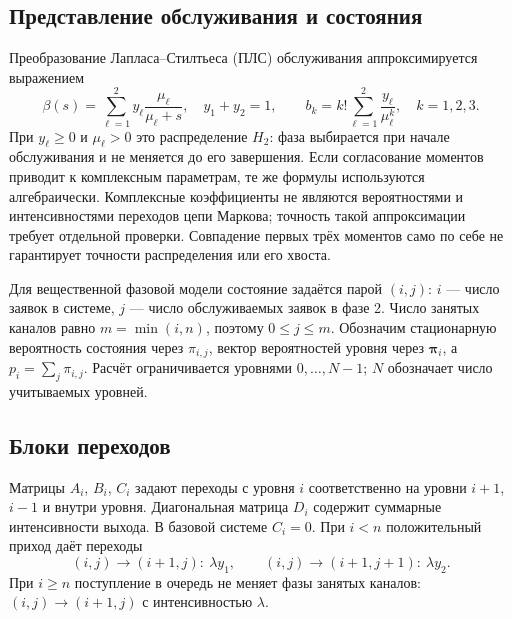 \documentclass[a4paper,12pt]{article}
\begin{document}
\subsection{Представление обслуживания и состояния}
Преобразование Лапласа--Стилтьеса (ПЛС) обслуживания аппроксимируется выражением
\[
\beta(s)=\sum_{\ell=1}^{2}y_\ell\frac{\mu_\ell}{\mu_\ell+s},\quad
y_1+y_2=1,\qquad
b_k=k!\sum_{\ell=1}^{2}\frac{y_\ell}{\mu_\ell^k},\quad k=1,2,3.
\]
При \(y_\ell\ge0\) и \(\mu_\ell>0\) это распределение \(H_2\): фаза выбирается при начале обслуживания и не меняется до его завершения. Если согласование моментов приводит к комплексным параметрам, те же формулы используются алгебраически. Комплексные коэффициенты не являются вероятностями и интенсивностями переходов цепи Маркова; точность такой аппроксимации требует отдельной проверки. Совпадение первых трёх моментов само по себе не гарантирует точности распределения или его хвоста.

Для вещественной фазовой модели состояние задаётся парой \((i,j)\): \(i\) --- число заявок в системе, \(j\) --- число обслуживаемых заявок в фазе 2. Число занятых каналов равно \(m=\min(i,n)\), поэтому \(0\le j\le m.\) Обозначим стационарную вероятность состояния через \(\pi_{i,j}\), вектор вероятностей уровня через \(\boldsymbol\pi_i\), а \(p_i=\sum_j\pi_{i,j}.\) Расчёт ограничивается уровнями \(0,\ldots,N-1\); \(N\) обозначает число учитываемых уровней.

\subsection{Блоки переходов}
Матрицы \(A_i\), \(B_i\), \(C_i\) задают переходы с уровня \(i\) соответственно на уровни \(i+1\), \(i-1\) и внутри уровня. Диагональная матрица \(D_i\) содержит суммарные интенсивности выхода. В базовой системе \(C_i=0.\) При \(i<n\) положительный приход даёт переходы
\[
(i,j)\to(i+1,j):\ \lambda y_1,\qquad
(i,j)\to(i+1,j+1):\ \lambda y_2.
\]
При \(i\ge n\) поступление в очередь не меняет фазы занятых каналов: \((i,j)\to(i+1,j)\) с интенсивностью \(\lambda.\)
\end{document}
